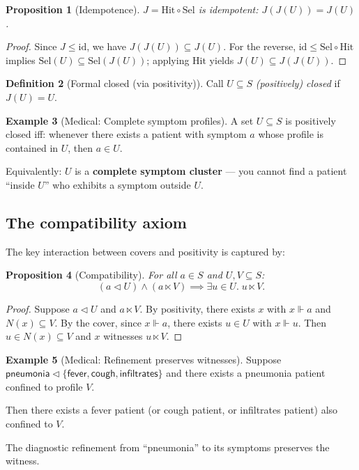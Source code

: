 \documentclass[11pt]{article}
\theoremstyle{definition}
\newtheorem{definition}{Definition}[section]
\newtheorem{example}[definition]{Example}
\theoremstyle{plain}
\newtheorem{proposition}[definition]{Proposition}
\newcommand{\Hit}{\mathrm{Hit}}
\newcommand{\Sel}{\mathrm{Sel}}
\newcommand{\forces}{\Vdash}
\newcommand{\ltimesrel}{\ltimes}
\newcommand{\covers}{\triangleleft}
\begin{document}
\begin{proposition}[Idempotence]\label{prop:idempotence-laws}
$J= \Hit\circ\Sel$ is idempotent: $J(J(U))=J(U)$.
\end{proposition}

\begin{proof}
Since $J\le \mathrm{id}$, we have $J(J(U))\subseteq J(U)$.
For the reverse, $\mathrm{id}\le \Sel\circ\Hit$ implies $\Sel(U)\subseteq \Sel(J(U))$; applying $\Hit$ yields $J(U)\subseteq J(J(U))$.
\end{proof}

\begin{definition}[Formal closed (via positivity)]
Call $U\subseteq S$ \emph{(positively) closed} if $J(U)=U$.
\end{definition}

\begin{example}[Medical: Complete symptom profiles]\label{ex:medical-closed}
A set $U \subseteq S$ is positively closed iff: whenever there exists a patient with symptom $a$
whose profile is contained in $U$, then $a \in U$.

Equivalently: $U$ is a \textbf{complete symptom cluster} --- you cannot find a patient ``inside $U$''
who exhibits a symptom outside $U$.
\end{example}

\subsection{The compatibility axiom}

The key interaction between covers and positivity is captured by:

\begin{proposition}[Compatibility]\label{prop:compatibility}
For all $a \in S$ and $U, V \subseteq S$:
\[
(a \covers U) \land (a \ltimesrel V) \implies \exists u \in U.\; u \ltimesrel V.
\]
\end{proposition}

\begin{proof}
Suppose $a \covers U$ and $a \ltimesrel V$.
By positivity, there exists $x$ with $x \forces a$ and $N(x) \subseteq V$.
By the cover, since $x \forces a$, there exists $u \in U$ with $x \forces u$.
Then $u \in N(x) \subseteq V$ and $x$ witnesses $u \ltimesrel V$.
\end{proof}

\begin{example}[Medical: Refinement preserves witnesses]
Suppose $\mathsf{pneumonia} \covers \{\mathsf{fever}, \mathsf{cough}, \mathsf{infiltrates}\}$
and there exists a pneumonia patient confined to profile $V$.

Then there exists a fever patient (or cough patient, or infiltrates patient) also confined to $V$.

The diagnostic refinement from ``pneumonia'' to its symptoms preserves the witness.
\end{example}
\end{document}
